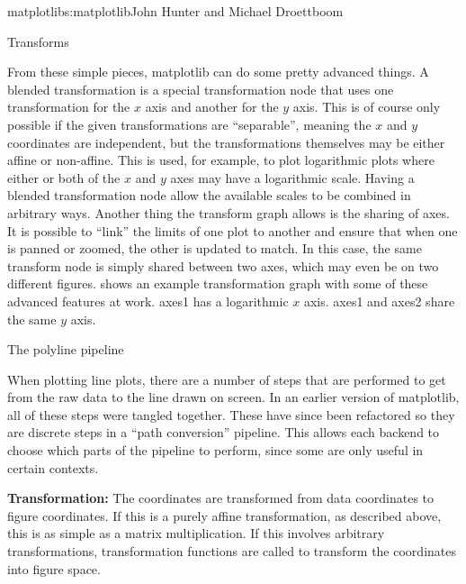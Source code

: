 \begin{aosachapter}{matplotlib}{s:matplotlib}{John Hunter and Michael Droettboom}
\begin{aosasect1}{Transforms}

From these simple pieces, matplotlib can do some pretty advanced
things.  A blended transformation is a special transformation node
that uses one transformation for the $x$ axis and another for the $y$
axis.  This is of course only possible if the given transformations
are ``separable'', meaning the $x$ and $y$ coordinates are
independent, but the transformations themselves may be either affine
or non-affine.  This is used, for example, to plot logarithmic plots
where either or both of the $x$ and $y$ axes may have a logarithmic
scale.  Having a blended transformation node allow the available
scales to be combined in arbitrary ways.  Another thing the transform
graph allows is the sharing of axes.  It is possible to ``link'' the
limits of one plot to another and ensure that when one is panned or
zoomed, the other is updated to match.  In this case, the same
transform node is simply shared between two axes, which may even be on
two different figures.  
shows an example transformation graph with some of these advanced
features at work.  axes1 has a logarithmic $x$ axis.  axes1 and axes2
share the same $y$ axis.


\end{aosasect1}

\begin{aosasect1}{The polyline pipeline}

When plotting line plots, there are a number of steps that are
performed to get from the raw data to the line drawn on screen.  In an
earlier version of matplotlib, all of these steps were tangled
together.  These have since been refactored so they are discrete steps
in a ``path conversion'' pipeline.  This allows each backend to choose
which parts of the pipeline to perform, since some are only useful in
certain contexts.

\begin{aosaenumerate}

\item \textbf{Transformation:} The coordinates are transformed from data
  coordinates to figure coordinates.  If this is a purely affine
  transformation, as described above, this is as simple as a matrix
  multiplication.  If this involves arbitrary transformations,
  transformation functions are called to transform the coordinates
  into figure space.


\end{aosaenumerate}
\end{aosasect1}
\end{aosachapter}

